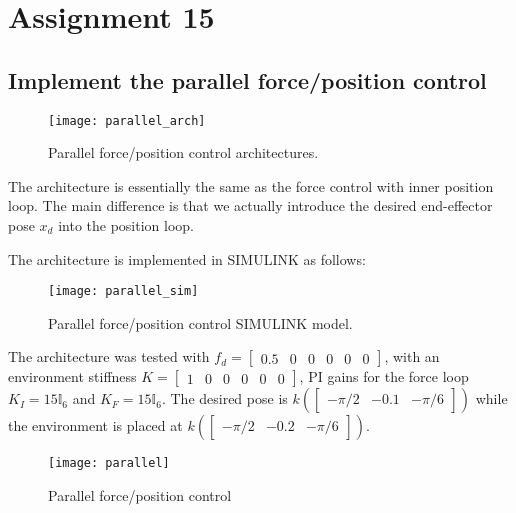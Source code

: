 \section{Assignment 15}

\subsection{Implement the parallel force/position control}

\begin{figure}[h]
\centering
\texttt{[image: parallel\_arch]}
\caption{Parallel force/position control architectures.}
\end{figure}

The architecture is essentially the same as the force control with inner position loop. The main difference is that we actually introduce the desired end-effector pose $x_d$ into  the position loop.

The architecture is implemented in SIMULINK as follows:

\begin{figure}[h]
\centering
\texttt{[image: parallel\_sim]}
\caption{Parallel force/position control SIMULINK model.}
\end{figure}

\newpage

The architecture was tested with $f_d = \begin{bmatrix}
0.5 & 0 & 0 & 0 & 0 & 0
\end{bmatrix}$, with an environment stiffness $K=\begin{bmatrix}
1 & 0 & 0 & 0 & 0 & 0
\end{bmatrix}$, PI gains for the force loop $K_I=15\mathbb I_6$ and $K_F=15\mathbb I_6$. The desired pose is $k(\begin{bmatrix}
-\pi/2 & -0.1 & -\pi/6
\end{bmatrix})$ while the environment is placed at  $k(\begin{bmatrix}
-\pi/2 & -0.2 & -\pi/6
\end{bmatrix})$.

\begin{figure}[h]
\centering
\texttt{[image: parallel]}
\caption{Parallel force/position control}
\end{figure}